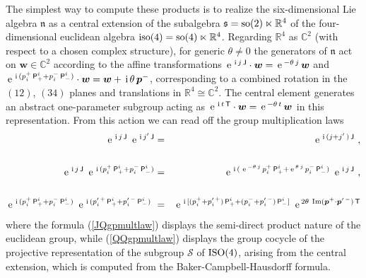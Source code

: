 \documentclass[11pt,a4paper]{article}
\def\nn{\nonumber}
\newcommand{\1}{\mathbb{1}}
\newcommand{\mbf}[1]{{\boldsymbol {#1} }}
\def\ii{{\,{\rm i}\,}}
\def\P{{\sf P}}
\def\T{{\sf T}}
\def\J{{\sf J}}
\def\mw{{\mbf w}}
\def\mbp{{\mbf p}}
\def\mfn{{\mathfrak n}}
\def\mfs{{\mathfrak s}}
\newcommand{\complex}{{\mathbb C}} %
\newcommand{\real}{{\mathbb R}} %
\def\nn{\nonumber}
\def\e{{\,\rm e}\,}
\def\bea{\begin{eqnarray}}
\def\eea{\end{eqnarray}}
\begin{document}
The simplest way to compute these products is to realize the
six-dimensional Lie algebra $\mfn$ as a central
extension of the subalgebra $\mfs={\rm so}(2)\ltimes\real^4$ of the
four-dimensional euclidean algebra
${\rm iso}(4)={\rm so}(4)\ltimes\real^4$. Regarding $\real^4$ as
$\complex^2$ (with respect to a chosen complex structure), for generic
$\theta\neq0$ the generators of $\mfn$ act on $\mw\in\complex^2$
according to the affine transformations $\e^{\ii
  j\,\J}\cdot\mw=\e^{-\theta\,j}\,\mw$ and
$\e^{\ii(p_i^+\,\P^i_++p_i^-\,\P^i_-)}\cdot\mw=\mw+\ii\theta\,\mbp^-$,
corresponding to a combined rotation in the $(12)$, $(34)$ planes and
translations in $\real^4\cong\complex^2$. The central element
generates an abstract one-parameter subgroup acting as $\e^{\ii
  t\,\T}\cdot\mw=\e^{-\theta\,t}\,\mw$ in this representation. From
this action we can read off the group multiplication laws
\bea
\e^{\ii j\,\J}~\e^{\ii j'\,\J}&=&\e^{\ii(j+j'\,)\,\J} \ ,
\label{JJgpmultlaw}\\
{~~~~}^{~~}_{~~}\nn\\\e^{\ii
  j\,\J}~\e^{\ii(p_i^+\,\P^i_++p_i^-\,\P^i_-)}
&=&\e^{\ii(\,\e^{-\theta\,j}\,p_i^+\,\P^i_+
+\e^{\theta\,j}\,p_i^-\,\P^i_-)}~\e^{\ii j\,\J} \ ,
\label{JQgpmultlaw}\\
{~~~~}^{~~}_{~~}\nn\\\e^{\ii(p_i^+\,\P^i_++p_i^-\,\P^i_-)}~
\e^{\ii(p_i^{\prime\,+}\,\P^i_++p_i^{\prime\,-}\,\P^i_-)}~
&=&\e^{\ii[(p_i^++p_i^{\prime\,+})\,\P^i_+
+(p_i^-+p_i^{\prime\,-})\,\P^i_-]}~\e^{2\theta~{\rm Im}(
\mbp^+\cdot\mbp^{\prime\,-})\,\T}
\label{QQgpmultlaw}\eea
where the formula (\ref{JQgpmultlaw}) displays the semi-direct product
nature of the euclidean group, while (\ref{QQgpmultlaw}) displays the
group cocycle of the projective representation of the subgroup
$\mathcal S$ of ${\rm ISO}(4)$, arising from the central extension,
which is computed from the Baker-Campbell-Hausdorff formula.
\end{document}
